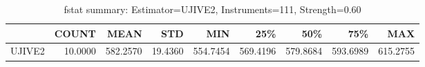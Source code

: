 \begin{table}[ht]
\centering
\caption{fstat summary: Estimator=UJIVE2, Instruments=111, Strength=0.60}
\begin{tabular}{lrrrrrrrr}
\toprule
 & COUNT & MEAN & STD & MIN & 25\% & 50\% & 75\% & MAX \\
\midrule
UJIVE2 & 10.0000 & 582.2570 & 19.4360 & 554.7454 & 569.4196 & 579.8684 & 593.6989 & 615.2755 \\
\bottomrule
\end{tabular}
\end{table}
